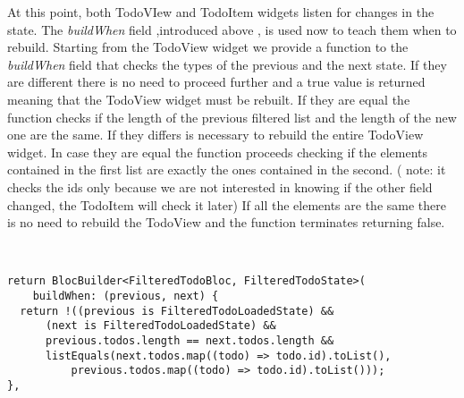 At this point, both TodoVIew and TodoItem widgets listen for changes in the state. The \textit{buildWhen} field ,introduced above , is used now to teach them when to rebuild. Starting from the TodoView widget we provide a function to the \textit{buildWhen} field that checks the types of the previous and the next state. If they are different there is no need to proceed further and a true value is returned meaning that the TodoView widget must be rebuilt. If they are equal the function checks if the length of the previous filtered list and the length of the new one are the same. If they differs is necessary to rebuild the entire TodoView widget. In case they are equal the function proceeds checking if the elements contained in the first list are exactly the ones contained in the second. ( note: it checks the ids only because we are not interested in knowing if the other field changed, the TodoItem will check it later) If all the elements are the same there is no need to rebuild the TodoView and the function terminates returning false.
\begin{code}
\mbox{}\\
 \mbox{}
\label{code:2.14}
\begin{verbatim}
return BlocBuilder<FilteredTodoBloc, FilteredTodoState>(
    buildWhen: (previous, next) {
  return !((previous is FilteredTodoLoadedState) &&
      (next is FilteredTodoLoadedState) &&
      previous.todos.length == next.todos.length &&
      listEquals(next.todos.map((todo) => todo.id).toList(),
          previous.todos.map((todo) => todo.id).toList()));
},
\end{verbatim}
\mbox{}
\end{code}

